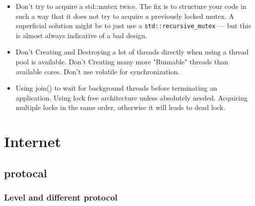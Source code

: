 \documentclass[a4paper,11pt,twoside]{book}
\begin{document}
\begin{itemize}
    
    \item Don't try to acquire a std::mutex twice. The fix is to structure your code in such a way that it does not try to acquire a previously locked mutex. A superficial solution might be to just use a \texttt{std::recursive\_mutex} — but this is almost always indicative of a bad design.

    \item Don't Creating and Destroying a lot of threads directly when using a thread pool is available. Don't Creating many more "Runnable" threads than available cores. Don't use volatile for synchronization.
    
    \item Using join() to wait for background threads before terminating an application. Using lock free architecture unless absolutely needed. Acquiring multiple locks in the same order, otherwise it will leads to dead lock.
    
\end{itemize}

\ifdefined\sixth

\chapter{Internet}
\section{protocal}
\subsection{Level and different protocol}
\end{document}
